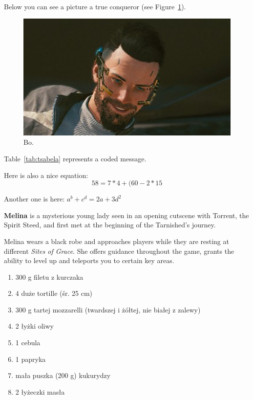 \label{sec:tymek}

Below you can see a picture a true conqueror (see Figure~\ref{fig:boi}).

\begin{figure}[htbp]
    \centering
    \includegraphics[width=1.0\textwidth]{Pictures/boi.jpg}
    \caption{Bo.}
    \label{fig:boi}
\end{figure}

Table~\ref{tab:tsabela} represents a coded message.



Here is also a nice equation: \[58=7*4+(60-2*15\]

Another one is here:
$ a^b + c^d = 2a + 3d^2 $

 \textbf{Melina} is a mysterious young lady seen in an opening cutscene with Torrent, the Spirit Steed, and first met at the beginning of the Tarnished's journey.\par
 Melina wears a black robe and approaches players while they are resting at different \textit{Sites of Grace}. She offers guidance throughout the game, grants the ability to level up and teleports you to certain key areas.


\begin{enumerate}
  \item  300 g filetu z kurczaka
  \item 4 duże tortille (śr. 25 cm)
  \item 300 g tartej mozzarelli (twardszej i żółtej, nie białej z zalewy)
  \item 2 łyżki oliwy
  \item 1 cebula
  \item 1 papryka
  \item mała puszka (200 g) kukurydzy
  \item 2 łyżeczki masła
\end{enumerate}